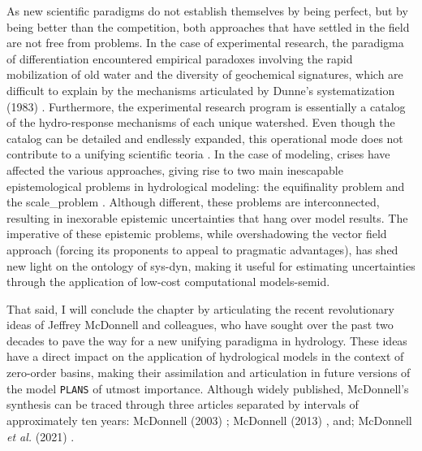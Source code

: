 \documentclass[./main_en.tex]{subfiles}
\begin{document}
\par As new scientific paradigms do not establish themselves by being perfect, but by being better than the competition, both approaches that have settled in the field are not free from problems. In the case of experimental research, the \gls{paradigma} of differentiation encountered empirical paradoxes involving the rapid mobilization of old water and the diversity of geochemical signatures, which are difficult to explain by the mechanisms articulated by Dunne's systematization (1983) \cite{Dunne1983}. Furthermore, the experimental research program is essentially a catalog of the \gls{hydro-response} mechanisms of each unique watershed. Even though the catalog can be detailed and endlessly expanded, this operational mode does not contribute to a unifying scientific \gls{teoria} \cite{Mcdonnell2003a}. In the case of modeling, crises have affected the various approaches, giving rise to two main inescapable epistemological problems in hydrological modeling: the equifinality problem and the \gls{scale_problem} \cite{Beven1996a}. Although different, these problems are interconnected, resulting in inexorable epistemic uncertainties that hang over model results. The imperative of these epistemic problems, while overshadowing the vector field approach (forcing its proponents to appeal to pragmatic advantages), has shed new light on the ontology of \gls{sys-dyn}, making it useful for estimating uncertainties through the application of low-cost computational \gls{models-semid}.

\par That said, I will conclude the chapter by articulating the recent revolutionary ideas of Jeffrey McDonnell and colleagues, who have sought over the past two decades to pave the way for a new unifying \gls{paradigma} in \gls{hydrology}. These ideas have a direct impact on the application of hydrological models in the context of zero-order basins, making their assimilation and articulation in future versions of the \gls{model} \texttt{PLANS} of utmost importance. Although widely published, McDonnell's synthesis can be traced through three articles separated by intervals of approximately ten years: McDonnell (2003) \cite{Mcdonnell2003a}; McDonnell (2013) \cite{Mcdonnell2013}, and; McDonnell \textit{et al.} (2021) \cite{mcdonnell2021}.
\end{document}
